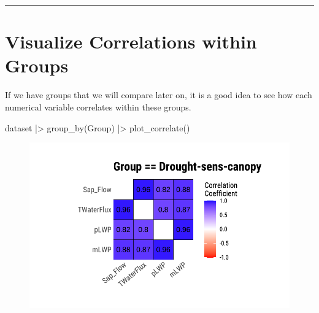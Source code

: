 \documentclass[
  letterpaper,
  DIV=11,
  numbers=noendperiod]{scrreprt}
\newenvironment{Shaded}{\begin{snugshade}}{\end{snugshade}}
\newcommand{\FunctionTok}[1]{\textcolor[rgb]{0.28,0.35,0.67}{#1}}
\newcommand{\NormalTok}[1]{\textcolor[rgb]{0.00,0.23,0.31}{#1}}
\newcommand{\SpecialCharTok}[1]{\textcolor[rgb]{0.37,0.37,0.37}{#1}}
\begin{document}
\begin{center}\rule{0.5\linewidth}{0.5pt}\end{center}

\hypertarget{visualize-correlations-within-groups}{%
\section{Visualize Correlations within
Groups}\label{visualize-correlations-within-groups}}

If we have groups that we will compare later on, it is a good idea to
see how each numerical variable correlates within these groups.

\begin{Shaded}
\begin{Highlighting}[]
\NormalTok{dataset }\SpecialCharTok{|\textgreater{}}
  \FunctionTok{group\_by}\NormalTok{(Group) }\SpecialCharTok{|\textgreater{}}
  \FunctionTok{plot\_correlate}\NormalTok{()}
\end{Highlighting}
\end{Shaded}

\begin{figure}[H]

{\centering \includegraphics{./CorrelateLikeDataMaster_files/figure-pdf/unnamed-chunk-5-1.pdf}

}

\end{figure}
\end{document}
